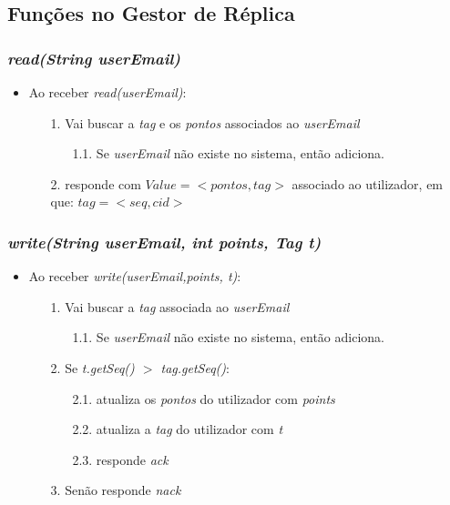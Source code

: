 \documentclass[a4paper]{article}
\begin{document}
\subsection{Funções no Gestor de Réplica}
\subsubsection{\textit{read(String userEmail)}}
\begin{itemize}
\item Ao receber \textit{read(userEmail)}:
\begin{itemize}
\item[1.] Vai buscar a \textit{tag} e os \textit{pontos} associados ao \textit{userEmail}
\begin{itemize}
\item[1.1.] Se \textit{userEmail} não existe no sistema, então adiciona.
\end{itemize}
\item[2.] responde com \textbf{$Value=< pontos, tag >$} associado ao utilizador, em que: $tag=< seq, cid>$
\end{itemize}
\end{itemize}
\subsubsection{\textit{write(String userEmail, int points, Tag t)}}
\begin{itemize}
\item Ao receber \textit{write(userEmail,points, t)}:
\begin{itemize}
\item[1.] Vai buscar a \textit{tag} associada ao \textit{userEmail}
\begin{itemize}
\item[1.1.] Se \textit{userEmail} não existe no sistema, então adiciona.
\end{itemize}
\item[2.] Se \textit{t.getSeq() $>$ tag.getSeq()}:
\begin{itemize}
\item[2.1.] atualiza os \textit{pontos} do utilizador com \textit{points}
\item[2.2.] atualiza a \textit{tag} do utilizador com \textit{t}
\item[2.3.] responde \textit{ack}
\end{itemize}
\item[3.] Senão responde \textit{nack}
\end{itemize}
\end{itemize}
\end{document}
